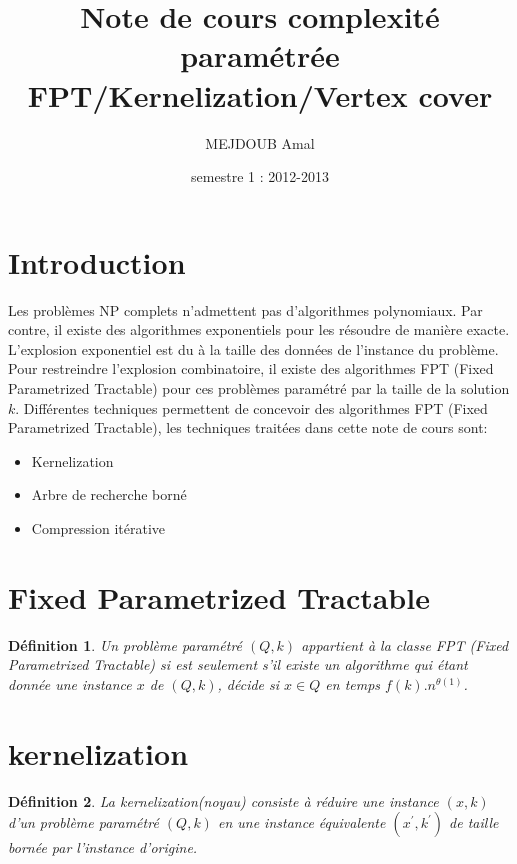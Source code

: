 \documentclass[a4paper, 12pt]{article}
\title{Note de cours complexité paramétrée \\FPT/Kernelization/Vertex cover}
\author{MEJDOUB Amal}
\date {semestre 1 : 2012-2013}
\newtheorem{mydef}{Définition}
\begin{document}
 

\maketitle

\pagebreak


\tableofcontents

\pagebreak
\section{Introduction}
Les problèmes NP complets n'admettent pas d'algorithmes polynomiaux. Par contre, il existe des algorithmes exponentiels pour les résoudre de manière exacte. L'explosion exponentiel est du à la taille des données de l'instance du problème. Pour restreindre l'explosion combinatoire, il existe des algorithmes FPT (Fixed Parametrized Tractable) pour ces problèmes paramétré par la taille de la solution $k$.
Différentes techniques permettent de concevoir des algorithmes FPT (Fixed Parametrized Tractable), les techniques traitées dans cette note de cours sont:
\begin{itemize}
\item Kernelization
\item Arbre de recherche borné 
\item Compression itérative
\end{itemize}
\section{Fixed Parametrized Tractable}
\begin{mydef}
Un problème paramétré $(Q,k)$ appartient à la classe FPT (Fixed Parametrized Tractable) si est seulement s'il existe un algorithme qui étant donnée une instance $x$ de $(Q,k)$, décide si $x \in Q$ en temps $f(k).n^{\theta(1)}$.
\end{mydef}
\section{kernelization}
\begin{mydef}
La kernelization(noyau) consiste à réduire une instance $(x,k)$ d'un problème paramétré $(Q,k)$ en une instance équivalente $(x^{'},k^{'})$ de taille bornée par l'instance d'origine.
\end{mydef}
\end{document}
